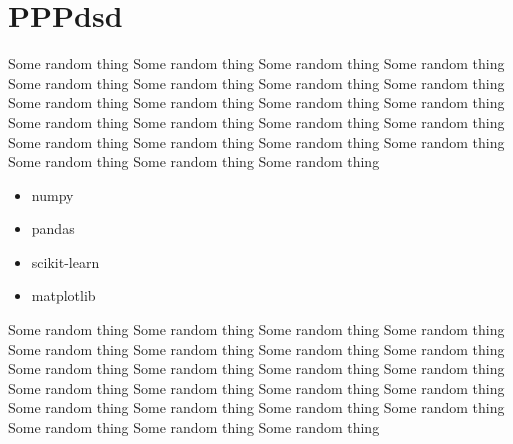 \chapter{PPPdsd}
\label{chap:chapter4}
Some random thing Some random thing Some random thing Some random thing Some random thing Some random thing Some random thing Some random thing Some random thing Some random thing Some random thing Some random thing Some random thing Some random thing Some random thing Some random thing Some random thing Some random thing Some random thing Some random thing Some random thing Some random thing Some random thing  
\begin{itemize}
    \item numpy
    \item pandas
    \item scikit-learn 
    \item matplotlib
\end{itemize}
Some random thing Some random thing Some random thing Some random thing Some random thing Some random thing Some random thing Some random thing Some random thing Some random thing Some random thing Some random thing Some random thing Some random thing Some random thing Some random thing Some random thing Some random thing Some random thing Some random thing Some random thing Some random thing Some random thing  \newline
